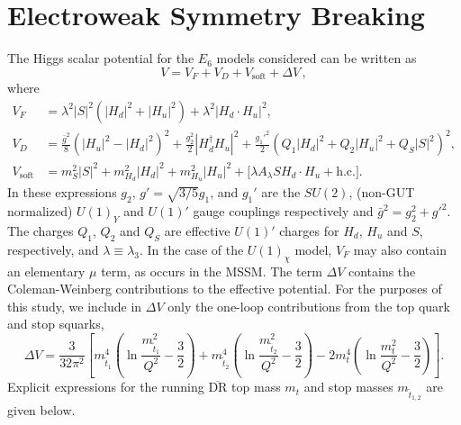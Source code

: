 \documentclass[preprint,amsmath,amssymb,aps,superscriptaddress,prd,
showpacs,floatfix,nofootinbib]{revtex4-1}
\begin{document}
\section{\label{sec:ewsb}Electroweak Symmetry
Breaking}

The Higgs scalar potential for the $E_6$ models considered can be written as
\cite{King:2005jy}
\begin{equation} \label{eq:E6VeffOneLoop}
V = V_F + V_D + V_{\textrm{soft}} + \Delta V \, ,
\end{equation}
where
\begin{align}
V_F &= \lambda^2 |S|^2 (|H_d|^2 + |H_u|^2) + \lambda^2 |H_d \cdot H_u|^2 ,
\label{eq:E6VFterms} \\
V_D &= \frac{\bar{g}^2}{8} \left (|H_u|^2 - |H_d|^2 \right )^2 +
\frac{g_2^2}{2} |H_d^\dagger H_u|^2 + \frac{g_1'^2}{2} (Q_1 |H_d|^2 +
Q_2 |H_u|^2 + Q_S |S|^2)^2 , \label{eq:E6VDterms} \\
V_{\textrm{soft}} &= m_S^2 |S|^2 + m_{H_d}^2 |H_d|^2 + m_{H_u}^2 |H_u|^2 +
\Big [\lambda A_\lambda S H_d \cdot H_u + \textrm{h.c.} \Big ] .
\label{eq:E6Vsoft}
\end{align}
In these expressions $g_2$, $g' = \sqrt{3/5} g_1$, and $g_1'$ are the
$SU(2)$, (non-GUT normalized) $U(1)_Y$ and $U(1)'$ gauge couplings
respectively and $\bar{g}^2 = g_2^2 + g'^2$.  The charges $Q_1$, $Q_2$ and
$Q_S$ are effective $U(1)'$ charges for $H_d$, $H_u$ and $S$, respectively,
and $\lambda \equiv \lambda_3$.  In the case of the $U(1)_\chi$ model, $V_F$
may also contain an elementary $\mu$ term, as occurs in the MSSM.  The term
$\Delta V$ contains the Coleman-Weinberg contributions to the effective
potential.  For the purposes of this study, we include in $\Delta V$ only the
one-loop contributions from the top quark and stop squarks,
\begin{equation}
\Delta V = \frac{3}{32\pi^2} \left [ m_{\tilde{t}_1}^4 \left ( \ln
\frac{m_{\tilde{t}_1}^2}{Q^2} - \frac{3}{2} \right ) + m_{\tilde{t}_2}^4
\left ( \ln \frac{m_{\tilde{t}_2}^2}{Q^2} - \frac{3}{2} \right ) - 2m_t^4
\left ( \ln \frac{m_t^2}{Q^2} - \frac{3}{2} \right ) \right ] .
\end{equation}
Explicit expressions for the running $\overline{\textrm{DR}}$ top mass $m_t$
and stop masses $m_{\tilde{t}_{1,2}}$ are given below.
\end{document}

